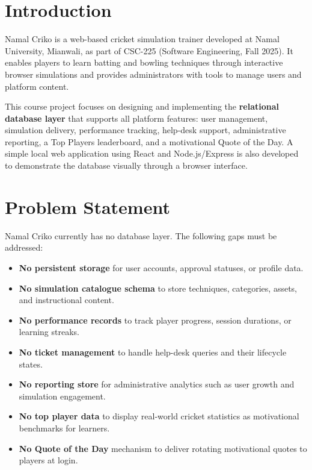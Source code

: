\documentclass[12pt,a4paper]{article}
\begin{document}
\section{Introduction}

Namal Criko is a web-based cricket simulation trainer developed at Namal University,
Mianwali, as part of CSC-225 (Software Engineering, Fall 2025). It enables players
to learn batting and bowling techniques through interactive browser simulations and
provides administrators with tools to manage users and platform content.

This course project focuses on designing and implementing the \textbf{relational database
layer} that supports all platform features: user management, simulation delivery,
performance tracking, help-desk support, administrative reporting, a Top Players
leaderboard, and a motivational Quote of the Day. A simple local web application
using React and Node.js/Express is also developed to demonstrate the database
visually through a browser interface.

\section{Problem Statement}

Namal Criko currently has no database layer. The following gaps must be addressed:

\begin{itemize}[leftmargin=1.5em]
    \item \textbf{No persistent storage} for user accounts, approval statuses,
    or profile data.
    \item \textbf{No simulation catalogue schema} to store techniques, categories,
    assets, and instructional content.
    \item \textbf{No performance records} to track player progress, session durations,
    or learning streaks.
    \item \textbf{No ticket management} to handle help-desk queries and their
    lifecycle states.
    \item \textbf{No reporting store} for administrative analytics such as user
    growth and simulation engagement.
    \item \textbf{No top player data} to display real-world cricket statistics
    as motivational benchmarks for learners.
    \item \textbf{No Quote of the Day} mechanism to deliver rotating motivational
    quotes to players at login.
\end{itemize}
\end{document}
